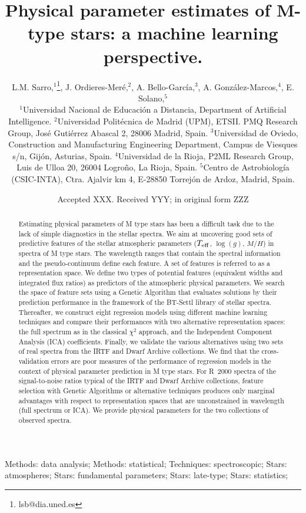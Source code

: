\documentclass[a4paper,fleqn,usenatbib]{mnras}
\title{Physical parameter estimates of M-type stars: a machine learning perspective.}
\author[L. M. Sarro et al.]
          {
L.M. Sarro,$^{1}$\thanks{lsb@dia.uned.es},
J. Ordieres-Mer\'e,$^{2}$,       
A. Bello-Garc\'ia,$^{3}$, 
A. Gonz\'alez-Marcos,$^{4}$, 
E. Solano,$^{5}$
\\
$^{1}$Universidad Nacional de Educaci\'{o}n a Distancia, Department of Artificial Intelligence.
$^{2}$Universidad Polit\'{e}cnica de Madrid (UPM), ETSII. PMQ Research Group, Jos\'{e} Guti\'{e}rrez Abascal 2, 28006 Madrid, Spain. 
$^{3}$Universidad de Oviedo, Construction and Manufacturing Engineering Department, Campus de Viesques s/n, Gij\'{o}n, Asturias, Spain. 
$^{4}$Universidad de la Rioja, P2ML Research Group, Luis de Ulloa 20, 26004 Logro\~{n}o, La Rioja, Spain. 
$^{5}$Centro de Astrobiología (CSIC-INTA), Ctra. Ajalvir km 4, E-28850 Torrejón de Ardoz, Madrid, Spain.
}
\date{Accepted XXX. Received YYY; in original form ZZZ}
\begin{document}
 
\label{firstpage}
\pagerange{\pageref{firstpage}--\pageref{lastpage}}
\maketitle

\begin{abstract}
    Estimating physical parameters of M type stars has been a
    difficult task due to the lack of simple diagnostics in the
    stellar spectra.  We aim at uncovering good sets of predictive
    features of the stellar atmospheric parameters ($T_{\rm eff}$,
    $\log(g)$, $M/H$) in spectra of M type stars.  The wavelength
    ranges that contain the spectral information and the
    pseudo-continuum define each feature. A set of features is
    referred to as a representation space.  We define two types of
    potential features (equivalent widths and integrated flux ratios)
    as predictors of the atmospheric physical parameters. We search
    the space of feature sets using a Genetic Algorithm that evaluates
    solutions by their prediction performance in the framework of the
    BT-Settl library of stellar spectra. Thereafter, we construct
    eight regression models using different machine learning
    techniques and compare their performances with two alternative
    representation spaces: the full spectrum as in the classical
    $\chi^2$ approach, and the Independent Component Analysis (ICA)
    coefficients. Finally, we validate the various alternatives using
    two sets of real spectra from the IRTF and Dwarf Archive
    collections.  We find that the cross-validation errors are poor
    measures of the performance of regression models in the context of
    physical parameter prediction in M type stars. For R~2000 spectra
    of the signal-to-noise ratios typical of the IRTF and Dwarf
    Archive collections, feature selection with Genetic Algorithms or
    alternative techniques produces only marginal advantages with
    respect to representation spaces that are unconstrained in
    wavelength (full spectrum or ICA). We provide physical parameters
    for the two collections of observed spectra.
\end{abstract}

\begin{keywords}
Methods: data analysis; Methods: statistical;
     Techniques: spectroscopic; Stars: atmospheres; Stars: fundamental
     parameters; Stars: late-type; Stars: statistics;
\end{keywords}
\end{document}
